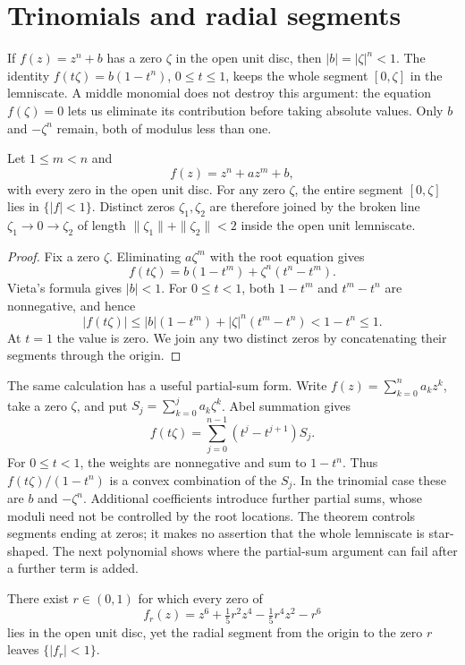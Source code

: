 \documentclass[11pt]{article}
\begin{document}
\section{Trinomials and radial segments}\label{sec:trinomial}

If $f(z)=z^n+b$ has a zero $\zeta$ in the open unit disc, then
$|b|=|\zeta|^n<1$. The identity $f(t\zeta)=b(1-t^n)$, $0\le t\le1$,
keeps the whole segment $[0,\zeta]$ in the lemniscate.
A middle monomial does not destroy this argument: the equation
$f(\zeta)=0$ lets us eliminate its contribution before taking absolute
values. Only $b$ and $-\zeta^n$ remain, both of modulus less than one.

\begin{theorem}
\label{res:trinomial-all-degree}
Let $1\le m<n$ and
\[
 f(z)=z^n+az^m+b,
\]
with every zero in the open unit disc.  For any zero $\zeta$, the entire
segment $[0,\zeta]$ lies in $\{|f|<1\}$.  Distinct zeros $\zeta_1,\zeta_2$
are therefore joined by the broken line $\zeta_1\to0\to\zeta_2$ of length
$\|\zeta_1\|+\|\zeta_2\|<2$ inside the open unit lemniscate.
\end{theorem}

\begin{proof}
Fix a zero $\zeta$. Eliminating $a\zeta^m$ with the root equation gives
\[
 f(t\zeta)=b(1-t^m)+\zeta^n(t^n-t^m).
\]
Vieta's formula gives $|b|<1$. For $0\le t<1$, both $1-t^m$ and
$t^m-t^n$ are nonnegative, and hence
\[
 |f(t\zeta)|\le |b|(1-t^m)+|\zeta|^n(t^m-t^n)<1-t^n\le1.
\]
At $t=1$ the value is zero. We join any two distinct zeros by concatenating
their segments through the origin.
\end{proof}

The same calculation has a useful partial-sum form. Write
$f(z)=\sum_{k=0}^n a_kz^k$, take a zero $\zeta$, and put
$S_j=\sum_{k=0}^j a_k\zeta^k$. Abel summation gives
\[
 f(t\zeta)=\sum_{j=0}^{n-1}(t^j-t^{j+1})S_j.
\]
For $0\le t<1$, the weights are nonnegative and sum to $1-t^n$.
Thus $f(t\zeta)/(1-t^n)$ is a convex combination of the $S_j$.
In the trinomial case these are $b$ and $-\zeta^n$. Additional coefficients introduce further partial sums, whose
moduli need not be controlled by the root locations. The theorem controls
segments ending at zeros; it makes no assertion that the whole
lemniscate is star-shaped. The next polynomial shows where the
partial-sum argument can fail after a further term is added.

\begin{proposition}
\label{res:sextic-spoke}
There exist $r\in(0,1)$ for which every zero of
\[
 f_r(z)=z^6+\tfrac15 r^2 z^4-\tfrac15 r^4 z^2-r^6
\]
lies in the open unit disc, yet the radial segment from the origin to the zero
$r$ leaves $\{|f_r|<1\}$.
\end{proposition}
\end{document}
